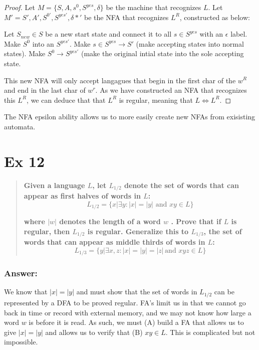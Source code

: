 \documentclass[titlepage]{article}\usepackage[]{graphicx}\usepackage[]{color}
\begin{document}
\begin{proof} 
	Let $M = \{S, A, s^0, S^{yes}, \delta\}$ be the machine that recognizes $L$.
	Let $M' = {S',A',S^{0'}, S^{yes'}, \delta*'}$ be the NFA that recognizes
	$L^R$, constructed as below:

	Let $S_{new} \in S$ be a new start state and connect it to all $s \in S^{yes}$
	with an $\epsilon$ label. 
	Make $S^0$ into an $S^{yes'}$. 
	Make $s \in S^{yes} \to S'$ (make accepting states into normal states).
	Make $S^{0} \to S^{yes'}$ (make the original intial state into the sole
	accepting state.

	This new NFA will only accept langagues that begin in the first char of the
	$w^R$ and end in the last char of $w^r$. As we have constructed an NFA that
	recognizes this $L^R$, we can deduce that that $L^R$ is regular, meaning
	that $L \Leftrightarrow L^R$.
\end{proof}

The NFA epsilon ability allows us to more easily create new NFAs from
exisisting automata.



\section*{Ex 12}
\begin{quote}
	\textbf{Given a language $L$, let $L_{1/2}$ denote the set of words that can appear
    as first halves of words in $L$:}
    \[ L_{1/2} = \{ x | \exists y : |x| = |y| \text{ and } x y \in L \} \]
    
  \textbf{where $|w |$ denotes the length of a word $w$ . Prove that if $L$ is
      regular, then $L_{1/2}$ is regular. Generalize this to $L_{1/3}$, the set of
      words that can appear as middle thirds of words in $L$:}
  \[ L_{1/3} = \{ y | \exists x,z : |x| = |y| = |z|\,  \text{and } x y z \in L \} \]
  
\end{quote}
\subsubsection*{Answer:}
We know that $|x| = |y|$ and must show that the set of words in $L_{1/2}$ can
be represented by a DFA to be proved regular. FA's limit us in that we cannot
go back in time or record with external memory, and we may not know how large a
word $w$ is before it is read. As such, we must (A) build a FA that allows us to
give $|x| = |y|$ and allows us to verify that (B) $xy \in L$. This is complicated
but not impossible.
\end{document}
